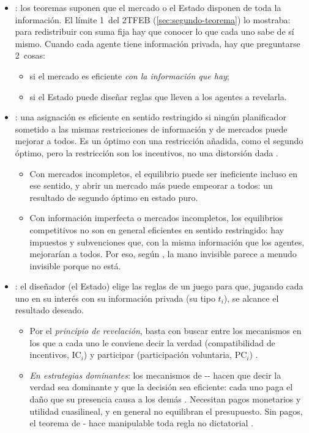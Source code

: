 \documentclass[11pt]{article}
\begin{document}
\begin{itemize}
\item {}: los teoremas suponen que el mercado o el Estado disponen de toda la información. El límite 1~del 2TFEB (\ref{sec:segundo-teorema}) lo mostraba: para redistribuir con suma fija hay que conocer lo que cada uno sabe de sí mismo. Cuando cada agente tiene información privada, hay que preguntarse 2~cosas:
  \begin{itemize}
  \item si el mercado es eficiente \emph{con la información que hay};
  \item si el Estado puede diseñar reglas que lleven a los agentes a revelarla.
  \end{itemize}
\item {}: una asignación es eficiente en sentido restringido si ningún planificador sometido a las mismas restricciones de información y de mercados puede mejorar a todos. Es un óptimo con una restricción añadida, como el segundo óptimo, pero la restricción son los incentivos, no una distorsión dada .
  \begin{itemize}
  \item Con mercados incompletos, el equilibrio puede ser ineficiente incluso en ese sentido, y abrir un mercado más puede empeorar a todos\nocite{Hart1975Optimality}: un resultado de segundo óptimo en estado puro.
  \item Con información imperfecta o mercados incompletos, los equilibrios competitivos no son en general eficientes en sentido restringido: hay impuestos y subvenciones que, con la misma información que los agentes, mejorarían a todos\nocite{GreenwaldStiglitz1986Externalities}. Por eso, según \textcite{Stiglitz2002Information}, la mano invisible parece a menudo invisible porque no está.
  \end{itemize}
\item {}: el diseñador (el Estado) elige las reglas de un juego para que, jugando cada uno en su interés con su información privada (su tipo $t_i$), se alcance el resultado deseado\nocite{Hurwicz1972Informationally}.
  \begin{itemize}
  \item Por el \emph{principio de revelación}, basta con buscar entre los mecanismos en los que a cada uno le conviene decir la verdad (compatibilidad de incentivos, $\mathrm{IC}_i$) y participar (participación voluntaria, $\mathrm{PC}_i$) .
  \item \emph{En estrategias dominantes}: los mecanismos de --\nocite{Vickrey1961Counterspeculation,Clarke1971Multipart,Groves1973Incentives} hacen que decir la verdad sea dominante y que la decisión sea eficiente: cada uno paga el daño que su presencia causa a los demás . Necesitan pagos monetarios y utilidad cuasilineal, y en general no equilibran el presupuesto\nocite{GreenLaffont1977Characterization}. Sin pagos, el teorema de - hace manipulable toda regla no dictatorial\nocite{Gibbard1973Manipulation,Satterthwaite1975Strategy} .

\end{itemize}
\end{itemize}
\end{document}
